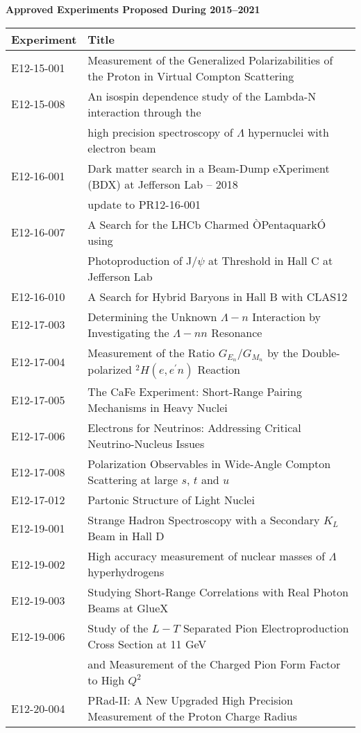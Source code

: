 \clearpage
\centerline{\bf Approved Experiments Proposed During 2015--2021}
\begin{tabular}{ll}
Experiment & Title\\
\hline
E12-15-001 & Measurement of the Generalized Polarizabilities of the Proton in Virtual Compton Scattering\\
E12-15-008 & An isospin dependence study of the Lambda-N interaction through the\\
& high precision spectroscopy of $\Lambda$ hypernuclei with electron beam\\
E12-16-001 & Dark matter search in a Beam-Dump eXperiment (BDX) at Jefferson Lab -- 2018\\
& update to PR12-16-001\\
E12-16-007 & A Search for the LHCb Charmed ÒPentaquarkÓ using\\
& Photoproduction of J/$\psi$ at Threshold in Hall C at Jefferson Lab\\
E12-16-010 & A Search for Hybrid Baryons in Hall B with CLAS12\\
E12-17-003 & Determining the Unknown $\Lambda-n$ Interaction by Investigating the $\Lambda-nn$ Resonance\\
E12-17-004 & Measurement of the Ratio $G_{E_n}/G_{M_n}$ by the Double-polarized $^2H(e,e^\prime n)$ Reaction\\
E12-17-005 & The CaFe Experiment: Short-Range Pairing Mechanisms in Heavy Nuclei\\
E12-17-006 & Electrons for Neutrinos: Addressing Critical Neutrino-Nucleus Issues\\
E12-17-008 & Polarization Observables in Wide-Angle Compton Scattering at large $s$, $t$ and $u$\\
E12-17-012 & Partonic Structure of Light Nuclei\\
E12-19-001 & Strange Hadron Spectroscopy with a Secondary $K_L$ Beam in Hall D\\
E12-19-002 & High accuracy measurement of nuclear masses of $\Lambda$ hyperhydrogens\\
E12-19-003 & Studying Short-Range Correlations with Real Photon Beams at GlueX\\
E12-19-006 & Study of the $L-T$ Separated Pion Electroproduction Cross Section at 11 GeV\\
& and Measurement of the Charged Pion Form Factor to High $Q^2$\\
E12-20-004 & PRad-II: A New Upgraded High Precision Measurement of the Proton Charge Radius\\

\end{tabular}
